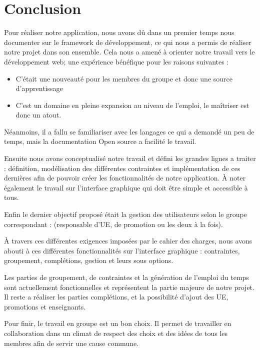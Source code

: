\documentclass[12pt,a4paper,openany]{memoir}
\begin{document}
\chapter{Conclusion}
\par
Pour réaliser notre application, nous avons dû dans un premier temps nous documenter sur le framework de développement, ce qui nous a permis de réaliser notre projet dans son ensemble. Cela nous a amené à orienter notre travail vers le développement web; une expérience bénéfique pour les raisons suivantes :\par
\begin{itemize}
    \item C'était une nouveauté pour les membres du groupe et donc une source d'apprentissage
    \item C'est un domaine en pleine expansion au niveau de l’emploi, le maîtriser est donc un atout.
\end{itemize}
\par
Néanmoins, il a fallu se familiariser avec les langages ce qui a demandé un peu de temps, mais la documentation Open source a facilité le travail.
\par
Ensuite nous avons conceptualisé notre travail et défini les grandes lignes a traiter : définition, modélisation des différentes contraintes et implémentation de ces dernières afin de pouvoir créer les fonctionnalités de notre application. À noter également le travail sur l’interface graphique qui doit être simple et accessible à tous. 
\par
Enfin le dernier objectif proposé était la gestion des utilisateurs selon le groupe correspondant : (responsable d'UE, de promotion ou les deux à la fois).
\par
À travers ces différentes exigences imposées par le cahier des charges, nous avons abouti à ces différentes fonctionnalités sur l'interface graphique : contraintes, groupement, complétions, gestion et leurs sous options.
\par 
Les parties de groupement, de contraintes et la génération de l'emploi du temps sont actuellement fonctionnelles et représentent la partie majeure de notre projet. Il reste a réaliser les parties complétions, et la possibilité d'ajout des UE, promotions et enseignants.
\par
Pour finir, le travail en groupe est un bon choix. Il permet de travailler en collaboration dans un climat de respect des choix et des idées de tous les membres afin de servir une cause commune.    
\end{document}
